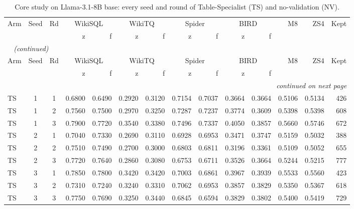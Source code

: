 {\small
{}
\setlength{\tabcolsep}{4.2pt}
\begin{longtable}{@{}lccrrrrrrrrrrr@{}}
\caption{Core study on Llama-3.1-8B base: every seed and round of Table-Specialist (TS) and no-validation (NV).}\label{tab:gen-perseed_core_base}\\
\toprule
\rowcolor{headshade}Arm & Seed & Rd & \multicolumn{2}{c}{WikiSQL} & \multicolumn{2}{c}{WikiTQ} & \multicolumn{2}{c}{Spider} & \multicolumn{2}{c}{BIRD} & M8 & ZS4 & Kept\\\rowcolor{headshade} & & & z & f & z & f & z & f & z & f & & &\\
\midrule
\endfirsthead
\multicolumn{14}{l}{\textit{\tablename~\thetable{} (continued)}}\\
\toprule
\rowcolor{headshade}Arm & Seed & Rd & \multicolumn{2}{c}{WikiSQL} & \multicolumn{2}{c}{WikiTQ} & \multicolumn{2}{c}{Spider} & \multicolumn{2}{c}{BIRD} & M8 & ZS4 & Kept\\\rowcolor{headshade} & & & z & f & z & f & z & f & z & f & & &\\
\midrule
\endhead
\midrule
\multicolumn{14}{r}{\textit{continued on next page}}\\
\endfoot
\bottomrule
\endlastfoot
TS & 1 & 1 & 0.6800 & 0.6490 & 0.2920 & 0.3120 & 0.7154 & 0.7037 & 0.3664 & 0.3664 & 0.5106 & 0.5134 & 426\\
TS & 1 & 2 & 0.7560 & 0.7500 & 0.2970 & 0.3250 & 0.7287 & 0.7237 & 0.3774 & 0.3609 & 0.5398 & 0.5398 & 608\\
TS & 1 & 3 & 0.7900 & 0.7720 & 0.3540 & 0.3380 & 0.7496 & 0.7337 & 0.4050 & 0.3857 & 0.5660 & 0.5746 & 672\\
TS & 2 & 1 & 0.7040 & 0.7330 & 0.2690 & 0.3110 & 0.6928 & 0.6953 & 0.3471 & 0.3747 & 0.5159 & 0.5032 & 388\\
TS & 2 & 2 & 0.7510 & 0.7490 & 0.2700 & 0.3000 & 0.6803 & 0.6811 & 0.3196 & 0.3361 & 0.5109 & 0.5052 & 655\\
TS & 2 & 3 & 0.7720 & 0.7640 & 0.2860 & 0.3080 & 0.6753 & 0.6711 & 0.3526 & 0.3664 & 0.5244 & 0.5215 & 777\\
TS & 3 & 1 & 0.7850 & 0.7800 & 0.3420 & 0.3420 & 0.7003 & 0.6861 & 0.3967 & 0.3939 & 0.5533 & 0.5560 & 423\\
TS & 3 & 2 & 0.7310 & 0.7240 & 0.3240 & 0.3310 & 0.7062 & 0.6953 & 0.3857 & 0.3829 & 0.5350 & 0.5367 & 618\\
TS & 3 & 3 & 0.7750 & 0.7690 & 0.3250 & 0.3440 & 0.6845 & 0.6594 & 0.3829 & 0.3802 & 0.5400 & 0.5419 & 729\\

\end{longtable}}
